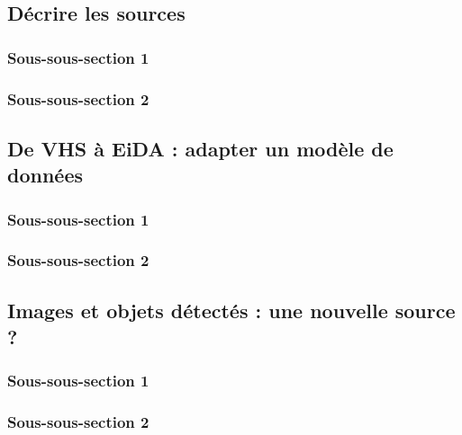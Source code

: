 
\subsection{Décrire les sources}
    \subsubsection{Sous-sous-section 1}
    
    \subsubsection{Sous-sous-section 2}

    
    \subsection{De VHS à EiDA : adapter un modèle de données}
        \subsubsection{Sous-sous-section 1}

        \subsubsection{Sous-sous-section 2}


    \subsection{Images et objets détectés : une nouvelle source ?}
        \subsubsection{Sous-sous-section 1}


        \subsubsection{Sous-sous-section 2}

